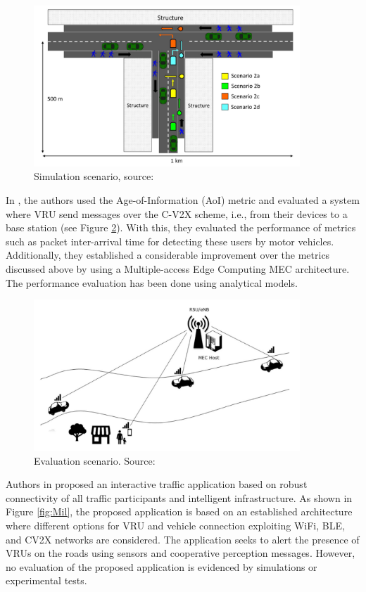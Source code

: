 \begin{figure}[ht!]
    \centering
    \includegraphics[width=10cm]{FIGURES/Fig6.png}
    \caption{Simulation scenario, source:\cite{Sewalkar2019}}
    \label{fig:Sew}
\end{figure}

In \cite{Emara2020}, the authors used the Age-of-Information (AoI) metric and evaluated a system where VRU send messages over the C-V2X scheme, i.e., from their devices to a base station (see Figure \ref{fig:Ema}). With this, they evaluated the performance of metrics such as packet inter-arrival time for detecting these users by motor vehicles. Additionally, they established a considerable improvement over the metrics discussed above by using a Multiple-access Edge Computing MEC architecture. The performance evaluation has been done using analytical models. 

\begin{figure}[ht!]
    \centering
    \includegraphics[width=10cm]{FIGURES/Fig8.png}
    \caption{Evaluation scenario. Source:\cite{Emara2020}}
    \label{fig:Ema}
\end{figure}

Authors in \cite{Militaru2021} proposed an interactive traffic application based on robust connectivity of all traffic participants and intelligent infrastructure. As shown in Figure \ref{fig:Mil}, the proposed application is based on an established architecture where different options for VRU and vehicle connection exploiting WiFi, BLE, and CV2X networks are considered. The application seeks to alert the presence of VRUs on the roads using sensors and cooperative perception messages. However, no evaluation of the proposed application is evidenced by simulations or experimental tests.



